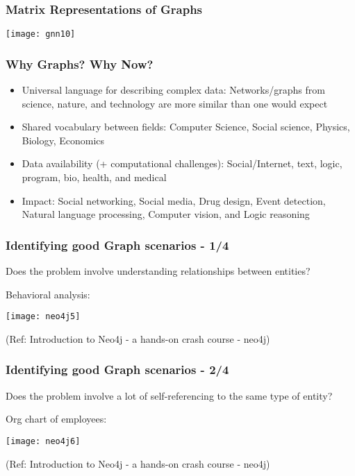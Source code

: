 \begin{frame}[fragile]\frametitle{Matrix Representations of Graphs}

\begin{center}
\texttt{[image: gnn10]}
\end{center}	  

\end{frame}

\begin{frame}[fragile]\frametitle{Why Graphs? Why Now?}

\begin{itemize}
\item Universal language for describing complex data: Networks/graphs from science, nature, and technology are more similar than one would expect
\item Shared vocabulary between fields: Computer Science, Social science, Physics, Biology, Economics 
\item Data availability (+ computational challenges): Social/Internet, text, logic, program, bio, health, and medical
\item Impact: Social networking, Social media, Drug design, Event detection, Natural language processing, Computer vision, and Logic reasoning
\end{itemize}

\end{frame}

\begin{frame}\frametitle{Identifying good Graph scenarios - 1/4}

Does the problem involve understanding relationships between entities?

Behavioral analysis:

\begin{center}
\texttt{[image: neo4j5]}
\end{center}	  

{\tiny (Ref: Introduction to Neo4j - a hands-on crash course - neo4j)}
\end{frame}

\begin{frame}\frametitle{Identifying good Graph scenarios - 2/4}

Does the problem involve a lot of self-referencing to the same type of entity?

Org chart of employees:

\begin{center}
\texttt{[image: neo4j6]}
\end{center}	  

{\tiny (Ref: Introduction to Neo4j - a hands-on crash course - neo4j)}
\end{frame}

